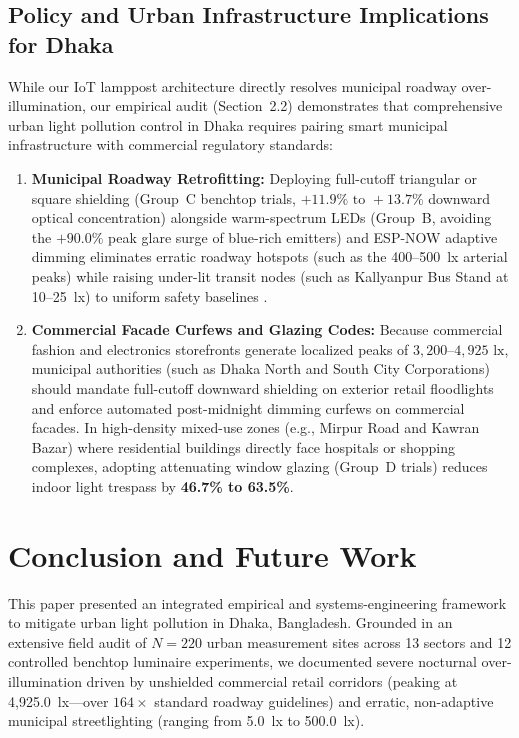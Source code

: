 \documentclass[11pt,a4paper]{article}
\begin{document}
\subsection{Policy and Urban Infrastructure Implications for Dhaka}
While our IoT lamppost architecture directly resolves municipal roadway over-illumination, our empirical audit (Section~2.2) demonstrates that comprehensive urban light pollution control in Dhaka requires pairing smart municipal infrastructure with commercial regulatory standards:
\begin{enumerate}
    \item \textbf{Municipal Roadway Retrofitting:} Deploying full-cutoff triangular or square shielding (Group~C benchtop trials, \(+11.9\%\text{ to }+13.7\%\) downward optical concentration) alongside warm-spectrum LEDs (Group~B, avoiding the \(+90.0\%\) peak glare surge of blue-rich emitters) and ESP-NOW adaptive dimming \cite{espressif_espnow} eliminates erratic roadway hotspots (such as the 400--500~lx arterial peaks) while raising under-lit transit nodes (such as Kallyanpur Bus Stand at 10--25~lx) to uniform safety baselines \cite{ies_rp8,cie115}.
    \item \textbf{Commercial Facade Curfews and Glazing Codes:} Because commercial fashion and electronics storefronts generate localized peaks of \(3{,}200\text{--}4{,}925\text{ lx}\), municipal authorities (such as Dhaka North and South City Corporations) should mandate full-cutoff downward shielding on exterior retail floodlights and enforce automated post-midnight dimming curfews on commercial facades. In high-density mixed-use zones (e.g., Mirpur Road and Kawran Bazar) where residential buildings directly face hospitals or shopping complexes, adopting attenuating window glazing (Group~D trials) reduces indoor light trespass by \textbf{46.7\% to 63.5\%}.
\end{enumerate}

\section{Conclusion and Future Work}
This paper presented an integrated empirical and systems-engineering framework to mitigate urban light pollution in Dhaka, Bangladesh. Grounded in an extensive field audit of \(N = 220\) urban measurement sites across 13 sectors and 12 controlled benchtop luminaire experiments, we documented severe nocturnal over-illumination driven by unshielded commercial retail corridors (peaking at 4,925.0~lx---over \(164\times\) standard roadway guidelines) and erratic, non-adaptive municipal streetlighting (ranging from 5.0~lx to 500.0~lx).
\end{document}
